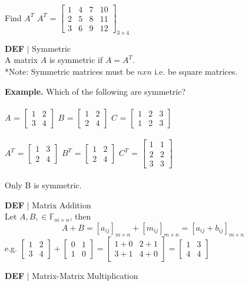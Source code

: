 \documentclass [12pt]{article}
\begin{document}
Find $A^T$\indent
$A^T$ = 
$\begin{bmatrix}
1&4&7&10\\
2&5&8&11\\
3&6&9&12
\end{bmatrix}_{3\times4}$\\
\begin{framed}
\noindent\textbf{DEF} $|$ Symmetric\\
A matrix $A$ is symmetric if $A=A^T$.\\
*Note: Symmetric matrices must be $nxn$ i.e. be square matrices.
\end{framed}
\noindent\textbf{Example.} Which of the following are symmetric?\\\\
$A$ = $\begin{bmatrix}
1&2\\
3&4
\end{bmatrix}$\indent
$B$ = $\begin{bmatrix}
1&2\\
2&4
\end{bmatrix}$\indent
$C$ = $\begin{bmatrix}
1&2&3\\
1&2&3
\end{bmatrix}$
\\\\
$A^T$ = $\begin{bmatrix}
1&3\\
2&4
\end{bmatrix}$\indent
$B^T$ = $\begin{bmatrix}
1&2\\
2&4
\end{bmatrix}$\indent
$C^T$ = $\begin{bmatrix}
1&1\\
2&2\\
3&3
\end{bmatrix}$\\\\
Only B is symmetric.
\begin{framed}
\noindent\textbf{DEF} $|$ Matrix Addition\\
Let $A,B,\in\mathbb{F}_{m\times n}$, then 
\[A+B=[a_{ij}]_{m\times n}+[m_{ij}]_{m\times n} =  [a_{ij}+b_{ij}]_{m\times n}\]
e.g. $\begin{bmatrix}
1&2\\
3&4
\end{bmatrix}+\begin{bmatrix}
0&1\\
1&0
\end{bmatrix}=\begin{bmatrix}
1+0&2+1\\
3+1&4+0
\end{bmatrix}=\begin{bmatrix}
1&3\\
4&4
\end{bmatrix}$
\end{framed}
\begin{framed}
\noindent\textbf{DEF} $|$ Matrix-Matrix Multiplication\\
\end{framed}
\end{document}
